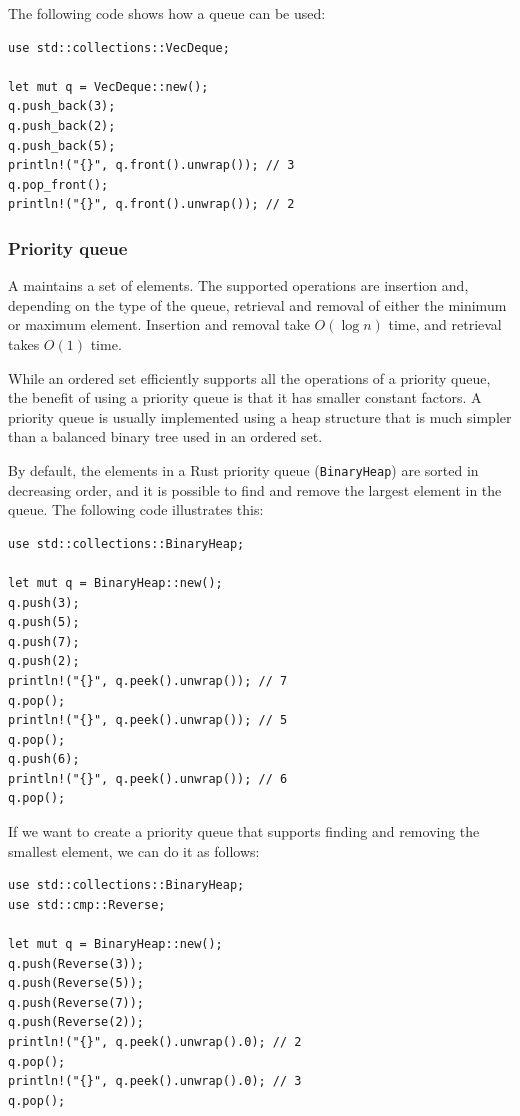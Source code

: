 The following code shows how a queue can be used:
\begin{lstlisting}
use std::collections::VecDeque;

let mut q = VecDeque::new();
q.push_back(3);
q.push_back(2);
q.push_back(5);
println!("{}", q.front().unwrap()); // 3
q.pop_front();
println!("{}", q.front().unwrap()); // 2
\end{lstlisting}

\subsubsection{Priority queue}


A 
maintains a set of elements.
The supported operations are insertion and,
depending on the type of the queue,
retrieval and removal of
either the minimum or maximum element.
Insertion and removal take $O(\log n)$ time,
and retrieval takes $O(1)$ time.

While an ordered set efficiently supports
all the operations of a priority queue,
the benefit of using a priority queue is
that it has smaller constant factors.
A priority queue is usually implemented using
a heap structure that is much simpler than a
balanced binary tree used in an ordered set.

\begin{samepage}
By default, the elements in a Rust
priority queue (\texttt{BinaryHeap}) are sorted in decreasing order,
and it is possible to find and remove the
largest element in the queue.
The following code illustrates this:

\begin{lstlisting}
use std::collections::BinaryHeap;

let mut q = BinaryHeap::new();
q.push(3);
q.push(5);
q.push(7);
q.push(2);
println!("{}", q.peek().unwrap()); // 7
q.pop();
println!("{}", q.peek().unwrap()); // 5
q.pop();
q.push(6);
println!("{}", q.peek().unwrap()); // 6
q.pop();
\end{lstlisting}
\end{samepage}

If we want to create a priority queue
that supports finding and removing
the smallest element,
we can do it as follows:

\begin{lstlisting}
use std::collections::BinaryHeap;
use std::cmp::Reverse;

let mut q = BinaryHeap::new();
q.push(Reverse(3));
q.push(Reverse(5));
q.push(Reverse(7));
q.push(Reverse(2));
println!("{}", q.peek().unwrap().0); // 2
q.pop();
println!("{}", q.peek().unwrap().0); // 3
q.pop();
\end{lstlisting}

